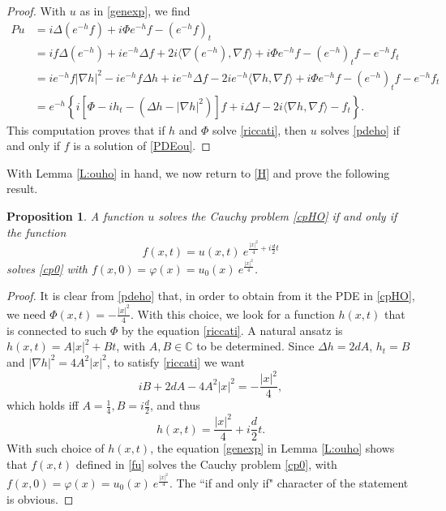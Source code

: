 \documentclass[11pt,a4paper]{amsart}
\def \vf{\varphi}
\numberwithin{equation}{section}
\newtheorem{proposition}[theorem]{Proposition}
\numberwithin{equation}{section}
\begin{document}
\begin{proof}
With $u$ as in \eqref{genexp}, we find
\begin{align*}
P u & = i \Delta(e^{-h} f) + i \Phi e^{-h} f - (e^{-h} f)_t
\\
& = i f \Delta(e^{-h}) + i e^{-h} \Delta f + 2 i \langle\nabla(e^{-h}),\nabla f\rangle + i \Phi e^{-h} f
 - (e^{-h})_t f -  e^{-h} f_t
\\
& = i e^{-h} f |\nabla h|^2 - i e^{-h} f \Delta h + i e^{-h} \Delta f - 2 i e^{-h} \langle\nabla h,\nabla f\rangle + i \Phi e^{-h} f
 - (e^{-h})_t f -  e^{-h} f_t
 \\
 & = e^{-h}\left\{i \left[\Phi - i h_t - (\Delta h - |\nabla h|^2 )\right] f + i \Delta f - 2 i \langle\nabla h,\nabla f\rangle - f_t\right\}.
\end{align*}
This computation proves that if $h$ and $\Phi$ solve \eqref{riccati}, then $u$ solves \eqref{pdeho} if and only if $f$ is a solution of \eqref{PDEou}.


\end{proof}


With Lemma \ref{L:ouho} in hand, we now return to \eqref{H} and prove the following result.
\begin{proposition}\label{P:connect}
A function $u$ solves the Cauchy problem \eqref{cpHO} if and only if the function
\begin{equation}\label{fu}
f(x,t) =  u(x,t)\ e^{\frac{|x|^2}4 + i \frac d2 t}
\end{equation}
solves \eqref{cp0} with $f(x,0) = \vf(x) = u_0(x)\ e^{\frac{|x|^2}4}$.
\end{proposition}

\begin{proof}
It is clear from \eqref{pdeho} that, in order to obtain from it the PDE in \eqref{cpHO}, we need  $\Phi(x,t) = - \frac{|x|^2}4$. With this choice, we look for a function $h(x,t)$ that is connected to such $\Phi$ by the equation \eqref{riccati}. A natural ansatz is $h(x,t) = A |x|^2 + B t$, with $A, B\in \mathbb C$ to be determined. Since $\Delta h = 2d A$, $h_t = B$ and $|\nabla h|^2 = 4 A^2 |x|^2$, to satisfy \eqref{riccati} we want
\[
i B + 2d A - 4 A^2 |x|^2 = - \frac{|x|^2}4,
\]
which holds iff $A = \frac{1}4, B =  i \frac d2$, and thus
\begin{equation}\label{h}
h(x,t) = \frac{|x|^2}4 + i \frac d2 t.
\end{equation}
With such choice of $h(x,t)$, the equation \eqref{genexp} in Lemma \ref{L:ouho} shows that $f(x,t)$ defined in \eqref{fu} solves the Cauchy problem \eqref{cp0}, with $f(x,0) = \vf(x) = u_0(x)\ e^{\frac{|x|^2}4}$. The ``if and only if" character of the statement is obvious.

\end{proof}
\end{document}
